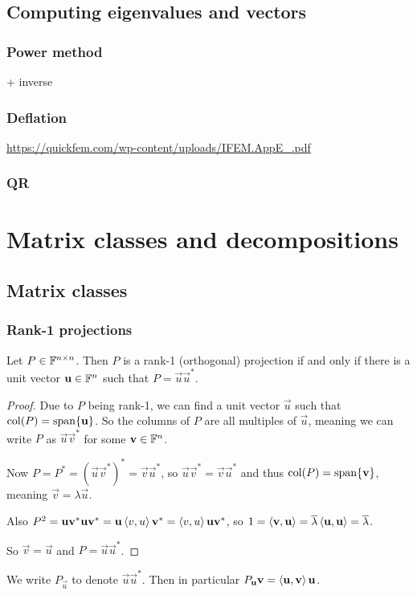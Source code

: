 \subsection{Computing eigenvalues and vectors}
\subsubsection{Power method}
+ inverse

\subsubsection{Deflation}
\url{https://quickfem.com/wp-content/uploads/IFEM.AppE_.pdf}

\subsubsection{QR}

\section{Matrix classes and decompositions}
\subsection{Matrix classes}
\subsubsection{Rank-1 projections}
\begin{proposition}
Let $P\in\mathbb{F}^{n\times n}$. Then $P$ is a rank-1 (orthogonal) projection \textup{if and only if} there is a unit vector $\bm{\mathrm{u}}\in\mathbb{F}^n$ such that $P= \vec{u}\vec{u}^*$.
\end{proposition}
\begin{proof}
Due to $P$ being rank-1, we can find a unit vector $\vec{u}$ such that $\operatorname{col}(P) = \operatorname{span}\{\bm{\mathrm{u}}\}$. So the columns of $P$ are all multiples of $\vec{u}$, meaning we can write $P$ as $\vec{u}\vec{v}^*$ for some $\bm{\mathrm{v}}\in\mathbb{F}^n$.

Now $P = P^*= (\vec{u}\vec{v}^*)^* = \vec{v}\vec{u}^*$, so $\vec{u}\vec{v}^* = \vec{v}\vec{u}^*$ and thus $\operatorname{col}(P) = \operatorname{span}\{\bm{\mathrm{v}}\}$, meaning $\vec{v} = \lambda \vec{u}$.

Also $P^2 = \bm{\mathrm{u}}\bm{\mathrm{v}}^*\bm{\mathrm{u}}\bm{\mathrm{v}}^* = \bm{\mathrm{u}}\left\langle v,u \right\rangle\bm{\mathrm{v}}^* = \left\langle v,u \right\rangle\bm{\mathrm{u}}\bm{\mathrm{v}}^*$, so $1 = \left\langle \bm{\mathrm{v}},\bm{\mathrm{u}} \right\rangle = \overline{\lambda}\left\langle \bm{\mathrm{u}},\bm{\mathrm{u}} \right\rangle = \overline{\lambda}$.

So $\vec{v}=\vec{u}$ and $P= \vec{u}\vec{u}^*$.
\end{proof}
We write $P_{\vec{u}}$ to denote $\vec{u}\vec{u}^*$. Then in particular $P_{\bm{\mathrm{u}}}\bm{\mathrm{v}} = \left\langle \bm{\mathrm{u}},\bm{\mathrm{v}} \right\rangle\bm{\mathrm{u}}$.

